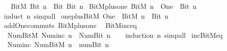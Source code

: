 \begin{isabellebody}
\ \ {\isacharbar}{\kern0pt}\ {\isachardoublequoteopen}BitM\ {\isacharparenleft}{\kern0pt}Bit{}\ n{\isacharparenright}{\kern0pt}\ {\isacharequal}{\kern0pt}\ Bit{}\ {\isacharparenleft}{\kern0pt}Bit{}\ n{\isacharparenright}{\kern0pt}{\isachardoublequoteclose}\isanewline
\isanewline
{}\isamarkupfalse%
\ BitM{\isacharunderscore}{\kern0pt}plus{\isacharunderscore}{\kern0pt}one{\isacharcolon}{\kern0pt}\ {\isachardoublequoteopen}BitM\ n\ {\isacharplus}{\kern0pt}\ One\ {\isacharequal}{\kern0pt}\ Bit{}\ n{\isachardoublequoteclose}\isanewline
%
\isadelimproof
\ \ %
\endisadelimproof
%
\isatagproof
{}\isamarkupfalse%
\ {\isacharparenleft}{\kern0pt}induct\ n{\isacharparenright}{\kern0pt}\ simp{\isacharunderscore}{\kern0pt}all%
\endisatagproof
{\isafoldproof}%
%
\isadelimproof
\isanewline
%
\endisadelimproof
\isanewline
{}\isamarkupfalse%
\ one{\isacharunderscore}{\kern0pt}plus{\isacharunderscore}{\kern0pt}BitM{\isacharcolon}{\kern0pt}\ {\isachardoublequoteopen}One\ {\isacharplus}{\kern0pt}\ BitM\ n\ {\isacharequal}{\kern0pt}\ Bit{}\ n{\isachardoublequoteclose}\isanewline
%
\isadelimproof
\ \ %
\endisadelimproof
%
\isatagproof
{}\isamarkupfalse%
\ add{\isacharunderscore}{\kern0pt}One{\isacharunderscore}{\kern0pt}commute\ BitM{\isacharunderscore}{\kern0pt}plus{\isacharunderscore}{\kern0pt}one\ \isacommand{{\isachardot}{\kern0pt}{\isachardot}{\kern0pt}}\isamarkupfalse%
%
\endisatagproof
{\isafoldproof}%
%
\isadelimproof
\isanewline
%
\endisadelimproof
\isanewline
{}\isamarkupfalse%
\ BitM{\isacharunderscore}{\kern0pt}inc{\isacharunderscore}{\kern0pt}eq{\isacharcolon}{\kern0pt}\isanewline
\ \ {\isacartoucheopen}Num{\isachardot}{\kern0pt}BitM\ {\isacharparenleft}{\kern0pt}Num{\isachardot}{\kern0pt}inc\ n{\isacharparenright}{\kern0pt}\ {\isacharequal}{\kern0pt}\ Num{\isachardot}{\kern0pt}Bit{}\ n{\isacartoucheclose}\isanewline
%
\isadelimproof
\ \ %
\endisadelimproof
%
\isatagproof
{}\isamarkupfalse%
\ {\isacharparenleft}{\kern0pt}induction\ n{\isacharparenright}{\kern0pt}\ simp{\isacharunderscore}{\kern0pt}all%
\endisatagproof
{\isafoldproof}%
%
\isadelimproof
\isanewline
%
\endisadelimproof
\isanewline
{}\isamarkupfalse%
\ inc{\isacharunderscore}{\kern0pt}BitM{\isacharunderscore}{\kern0pt}eq{\isacharcolon}{\kern0pt}\isanewline
\ \ {\isacartoucheopen}Num{\isachardot}{\kern0pt}inc\ {\isacharparenleft}{\kern0pt}Num{\isachardot}{\kern0pt}BitM\ n{\isacharparenright}{\kern0pt}\ {\isacharequal}{\kern0pt}\ num{\isachardot}{\kern0pt}Bit{}\ n{\isacartoucheclose}\isanewline

\end{isabellebody}
